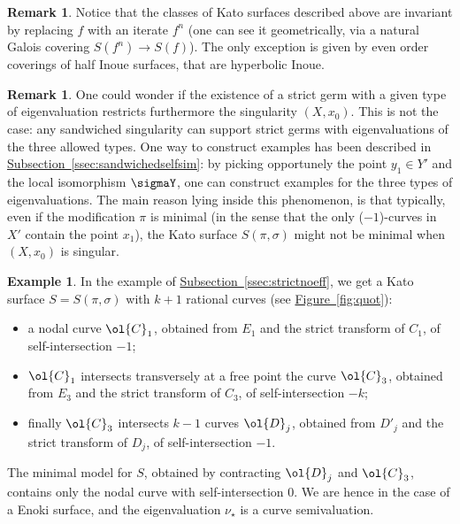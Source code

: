 \documentclass[11 pt, twoside, a4paper]{amsart}
\newcommand{\Kpi}{{\pi}} %
\newcommand{\Ksigma}{{\sigma}} %
\theoremstyle{definition}
\newtheorem{rem}[thm]{Remark}
\newtheorem{ex}[thm]{Example}
\theoremstyle{definition}
\newcommand{\refssec}[1]{\hyperref[ssec:#1]{Subsection~\ref*{ssec:#1}}}
\newcommand{\reffig}[1]{\hyperref[fig:#1]{Figure~\ref*{fig:#1}}}
\begin{document}
\begin{rem}
Notice that the classes of Kato surfaces described above are invariant by replacing $f$ with an iterate $f^n$ (one can see it geometrically, via a natural Galois covering $S(f^n) \to S(f)$). The only exception is given by even order coverings of half Inoue surfaces, that are hyperbolic Inoue.
\end{rem}

\begin{rem}
One could wonder if the existence of a strict germ with a given type of eigenvaluation restricts furthermore the singularity $(X,x_0)$. This is not the case: any sandwiched singularity can support strict germs with eigenvaluations of the three allowed types.
One way to construct examples has been described in \refssec{sandwichedselfsim}: by picking opportunely the point $y_1 \in Y'$ and the local isomorphism $\sigmaY$, one can construct examples for the three types of eigenvaluations.
The main reason lying inside this phenomenon, is that typically, even if the modification $\Kpi$ is minimal (in the sense that the only ($-1$)-curves in $X'$ contain the point $x_1$), the Kato surface $S(\Kpi,\Ksigma)$ might not be minimal when $(X,x_0)$ is singular.

\end{rem}

\begin{ex}
In the example of \refssec{strictnoeff}, we get a Kato surface $S=S(\Kpi,\Ksigma)$ with $k+1$ rational curves (see \reffig{quot}):
\begin{itemize}
\item a nodal curve $\ol{C}_1$, obtained from $E_1$ and the strict transform of $C_1$, of self-intersection $-1$;
\item $\ol{C}_1$ intersects transversely at a free point the curve $\ol{C}_3$, obtained from $E_3$ and the strict transform of $C_3$, of self-intersection $-k$;
\item finally $\ol{C}_3$ intersects $k-1$ curves $\ol{D}_j$, obtained from $D'_j$ and the strict transform of $D_j$, of self-intersection $-1$.
\end{itemize}
The minimal model for $S$, obtained by contracting $\ol{D}_j$ and $\ol{C}_3$, contains only the nodal curve with self-intersection $0$.
We are hence in the case of a Enoki surface, and the eigenvaluation $\nu_\star$ is a curve semivaluation.
\end{ex}
















\small
%



\end{document}
